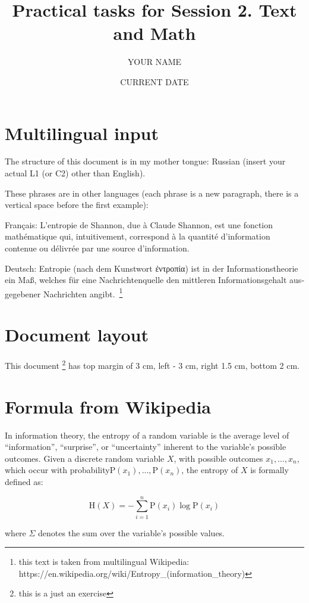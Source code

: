 \documentclass[a4paper,11pt]{article}
\title{Practical tasks for Session 2. Text and Math}
\author{YOUR NAME}
\date{CURRENT DATE}
\begin{document}
\maketitle
\tableofcontents


\section{Multilingual input}
The structure of this document is in my mother tongue: {\color{blue} Russian} (insert your actual L1 (or C2) other than English).

These phrases are in other languages (each phrase is a new paragraph, there is a vertical space before the first example): 

\bigskip

{\color{red}Français}: L'entropie de Shannon, due à Claude Shannon, est une fonction mathématique qui, intuitivement, correspond à la quantité d'information contenue ou délivrée par une source d'information.

\foreignlanguage{german}{{\color{red}Deutsch}: Entropie (nach dem Kunstwort \foreignlanguage{greek}{ἐντροπία}) ist in der Informationstheorie ein Maß, welches für eine Nachrichtenquelle den mittleren Informationsgehalt ausgegebener Nachrichten angibt.}~\footnote{this text is taken from multilingual Wikipedia: https://en.wikipedia.org/wiki/Entropy\_(information\_theory)}

\section{Document layout}

This document \footnote{this is a just an exercise} has top margin of 3 cm, left - 3 cm, right 1.5 cm, bottom 2 cm.


\section{Formula from Wikipedia}
In information theory, the entropy of a random variable is the average level of ``information'', ``surprise'', or ``uncertainty'' inherent to the variable's possible outcomes. Given a discrete random variable $X$, with possible outcomes $x_{1},...,x_{n}$, which occur with probability$\mathrm {P} (x_{1}),...,\mathrm {P} (x_{n})$, the entropy of $X$ is formally defined as:

\[ \mathrm {H} (X)=-\sum _{i=1}^{n}{\mathrm {P} (x_{i})\log \mathrm {P} (x_{i})} \]

where $\Sigma$ denotes the sum over the variable's possible values. 
\end{document}

